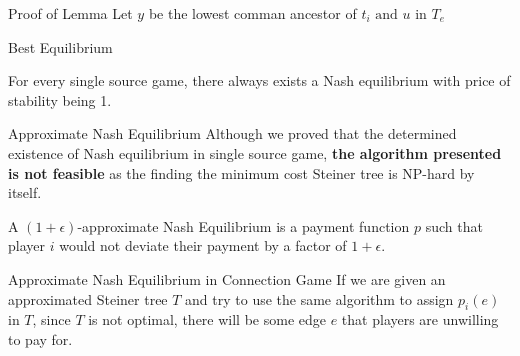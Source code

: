 \documentclass[11pt,aspectratio=169]{beamer}
\begin{document}
\begin{frame}{Proof of Lemma}
    Let $y$ be the lowest comman ancestor of $t_i \text{ and } u \text{ in } T_e$
\end{frame}

\begin{frame}{Best Equilibrium}
    \begin{theorem}
        For every single source game, there always exists a Nash equilibrium with price of stability being 1.
    \end{theorem}
\end{frame}

\begin{frame}{Approximate Nash Equilibrium}
    Although we proved that the determined existence of Nash equilibrium in single source game, \textbf{the algorithm presented is not feasible} as the finding the minimum cost Steiner tree is NP-hard by itself. \\
    \vspace{10pt}
\begin{definition}
	A \((1+\epsilon)\)-approximate Nash Equilibrium is a payment function \(p\) such that player \(i\) would not deviate their payment by a factor of \(1+\epsilon\).
\end{definition}
\end{frame}

\begin{frame}{Approximate Nash Equilibrium in Connection Game}
If we are given an approximated Steiner tree \(T\) and try to use the same algorithm to assign \(p_i(e)\) in \(T\), since \(T\) is not optimal, there will be some edge \(e\) that players are unwilling to pay for. \\
\vspace{20pt}
\centering
{}
\end{frame}
\end{document}
